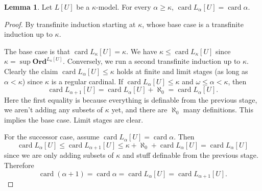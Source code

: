 \documentclass[12pt]{report}
\newcommand{\card}{\operatorname{card}}
\newcommand{\Ord}{\mathbf{Ord}}
\theoremstyle{definition}
\newtheorem{lemma}[theorem]{Lemma}
\begin{document}
\begin{lemma}
Let $L[U]$ be a $\kappa$-model. For every $\alpha \geq \kappa$, $\card L_\alpha[U] = \card \alpha$.
\end{lemma}
\begin{proof}
By transfinite induction starting at $\kappa$, whose base case is a transfinite induction up to $\kappa$.

The base case is that $\card L_\kappa[U] = \kappa$.
We have $\kappa \leq \card L_\kappa[U]$ since $\kappa = \sup \Ord^{L_\kappa[U]}$. Conversely, we run a second transfinite induction up to $\kappa$.
Clearly the claim $\card L_\alpha[U] \leq \kappa$ holds at finite and limit stages (as long as $\alpha < \kappa$) since $\kappa$ is a regular cardinal.
If $\card L_\alpha[U] \leq \kappa$ and $\omega \leq \alpha < \kappa$, then
$$\card L_{\alpha + 1}[U] = \card L_\alpha[U] + \aleph_0 = \card L_\alpha[U].$$
Here the first equality is because everything is definable from the previous stage, we aren't adding any subsets of $\kappa$ yet, and there are $\aleph_0$ many definitions.
This implies the base case. Limit stages are clear.

For the successor case, assume $\card L_\alpha[U] = \card \alpha$.
Then
$$\card L_\alpha[U] \leq \card L_{\alpha+1}[U] \leq \kappa + \aleph_0 + \card L_\alpha[U] = \card L_\alpha[U]$$
since we are only adding subsets of $\kappa$ and stuff definable from the previous stage.
Therefore
$$\card(\alpha+1) = \card \alpha = \card L_\alpha[U] = \card L_{\alpha+1}[U].$$
\end{proof}
\end{document}
